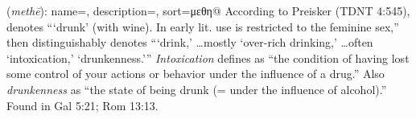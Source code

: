 \item[Drunkenness,]

(\textit{methē}):
{
    name=,
    description={},
    sort=μεθη@
}
According to Preisker (TDNT 4:545),  denotes ```drunk' (with wine). In early lit. use is restricted to the feminine sex,'' then  distinguishably denotes ```drink,' \ldots mostly `over-rich drinking,' \ldots often `intoxication,' `drunkenness.'''  \emph{Intoxication} defines as ``the condition of having lost some control of your actions or behavior under the influence of a drug.'' Also \emph{drunkenness}  as ``the state of being drunk (= under the influence of alcohol).''
Found in Gal 5:21; Rom 13:13.
